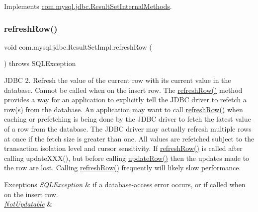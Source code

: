 Implements \mbox{\hyperlink{interfacecom_1_1mysql_1_1jdbc_1_1_result_set_internal_methods_a1d2bda162ae25d5209f62788938d2737}{com.\+mysql.\+jdbc.\+Result\+Set\+Internal\+Methods}}.

\mbox{\label{classcom_1_1mysql_1_1jdbc_1_1_result_set_impl_af5e8cda0758ec8d39e7fc8fbd6f5b5a0}} 
\subsubsection{\texorpdfstring{refresh\+Row()}{refreshRow()}}
{\footnotesize\ttfamily void com.\+mysql.\+jdbc.\+Result\+Set\+Impl.\+refresh\+Row (\begin{DoxyParamCaption}{ }\end{DoxyParamCaption}) throws S\+Q\+L\+Exception}

J\+D\+BC 2. Refresh the value of the current row with its current value in the database. Cannot be called when on the insert row. The \mbox{\hyperlink{classcom_1_1mysql_1_1jdbc_1_1_result_set_impl_af5e8cda0758ec8d39e7fc8fbd6f5b5a0}{refresh\+Row()}} method provides a way for an application to explicitly tell the J\+D\+BC driver to refetch a row(s) from the database. An application may want to call \mbox{\hyperlink{classcom_1_1mysql_1_1jdbc_1_1_result_set_impl_af5e8cda0758ec8d39e7fc8fbd6f5b5a0}{refresh\+Row()}} when caching or prefetching is being done by the J\+D\+BC driver to fetch the latest value of a row from the database. The J\+D\+BC driver may actually refresh multiple rows at once if the fetch size is greater than one. All values are refetched subject to the transaction isolation level and cursor sensitivity. If \mbox{\hyperlink{classcom_1_1mysql_1_1jdbc_1_1_result_set_impl_af5e8cda0758ec8d39e7fc8fbd6f5b5a0}{refresh\+Row()}} is called after calling update\+X\+X\+X(), but before calling \mbox{\hyperlink{classcom_1_1mysql_1_1jdbc_1_1_result_set_impl_a2842d32292d023aaeeafedeed3322981}{update\+Row()}} then the updates made to the row are lost. Calling \mbox{\hyperlink{classcom_1_1mysql_1_1jdbc_1_1_result_set_impl_af5e8cda0758ec8d39e7fc8fbd6f5b5a0}{refresh\+Row()}} frequently will likely slow performance.


\begin{DoxyExceptions}{Exceptions}
{\em S\+Q\+L\+Exception} & if a database-\/access error occurs, or if called when on the insert row. \\
\hline
{\em \mbox{\hyperlink{classcom_1_1mysql_1_1jdbc_1_1_not_updatable}{Not\+Updatable}}} & \\
\hline
\end{DoxyExceptions}
\mbox{\label{classcom_1_1mysql_1_1jdbc_1_1_result_set_impl_a0b651b9e4f93639c884c9625b6776733}} 
